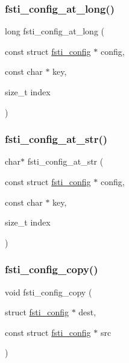 \mbox{\label{fsti-config_8h_a66e20fd6ac731a2183f5f303d9707058}} 
\subsubsection{\texorpdfstring{fsti\+\_\+config\+\_\+at\+\_\+long()}{fsti\_config\_at\_long()}}
{\footnotesize\ttfamily long fsti\+\_\+config\+\_\+at\+\_\+long (\begin{DoxyParamCaption}\item[{const struct \mbox{\hyperlink{structfsti__config}{fsti\+\_\+config}} $\ast$}]{config,  }\item[{const char $\ast$}]{key,  }\item[{size\+\_\+t}]{index }\end{DoxyParamCaption})}

\mbox{\label{fsti-config_8h_aa51f915ff212933ab1b10a22b82b1464}} 
\subsubsection{\texorpdfstring{fsti\+\_\+config\+\_\+at\+\_\+str()}{fsti\_config\_at\_str()}}
{\footnotesize\ttfamily char$\ast$ fsti\+\_\+config\+\_\+at\+\_\+str (\begin{DoxyParamCaption}\item[{const struct \mbox{\hyperlink{structfsti__config}{fsti\+\_\+config}} $\ast$}]{config,  }\item[{const char $\ast$}]{key,  }\item[{size\+\_\+t}]{index }\end{DoxyParamCaption})}

\mbox{\label{fsti-config_8h_a634d47df34013cf7bba0c3dc67d8e45f}} 
\subsubsection{\texorpdfstring{fsti\+\_\+config\+\_\+copy()}{fsti\_config\_copy()}}
{\footnotesize\ttfamily void fsti\+\_\+config\+\_\+copy (\begin{DoxyParamCaption}\item[{struct \mbox{\hyperlink{structfsti__config}{fsti\+\_\+config}} $\ast$}]{dest,  }\item[{const struct \mbox{\hyperlink{structfsti__config}{fsti\+\_\+config}} $\ast$}]{src }\end{DoxyParamCaption})}

